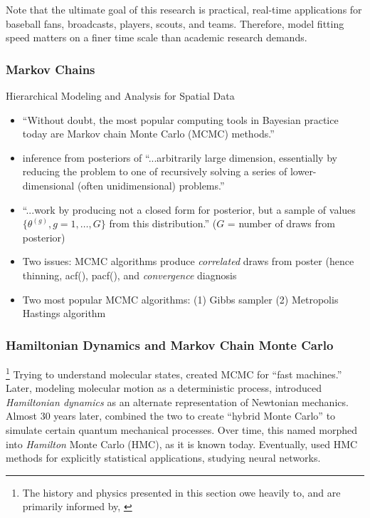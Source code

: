 \documentclass{article}
\begin{document}
Note that the ultimate goal of this research is practical, real-time applications for baseball fans, broadcasts, players, scouts, and teams. Therefore, model fitting speed matters on a finer time scale than academic research demands.  

\subsubsection{Markov Chains}

Hierarchical Modeling and Analysis for Spatial Data \citep{Banerjee2014}
        \begin{itemize} %
        \item ``Without doubt, the most popular computing tools in Bayesian practice today are Markov chain Monte Carlo (MCMC) methods.'' 
        \item inference from posteriors of ``...arbitrarily large dimension, essentially by reducing the problem to one of recursively solving a series of lower-dimensional (often unidimensional) problems.'' 
        \item ``...work by producing not a closed form for posterior, but a sample of values $\{\theta^{(g)}, g = 1, \dots, G\}$ from this distribution.'' ($G$ = number of draws from posterior) 
        \item Two issues: MCMC algorithms produce {\it correlated} draws from poster (hence thinning, acf(), pacf(), and {\it convergence} diagnosis 
        \item Two most popular MCMC algorithms: (1) Gibbs sampler (2) Metropolis Hastings algorithm
        \end{itemize} %

\subsubsection{Hamiltonian Dynamics and Markov Chain Monte Carlo} 
\footnote{The history and physics presented in this section owe heavily to, and are primarily informed by, \citep{Neal2011}} Trying to understand molecular states, \cite{Metropolis1953} created MCMC for ``fast machines.'' Later, modeling molecular motion as a deterministic process, \cite{Alder1959} introduced {\it Hamiltonian dynamics} as an alternate representation of Newtonian mechanics. Almost 30 years later, \cite{Duane1987} combined the two to create ``hybrid Monte Carlo'' to simulate certain quantum mechanical processes. Over time, this named morphed into {\it Hamilton} Monte Carlo (HMC), as it is known today. Eventually, \cite{Neal1996} used HMC methods for explicitly statistical applications, studying neural networks.
\end{document}
